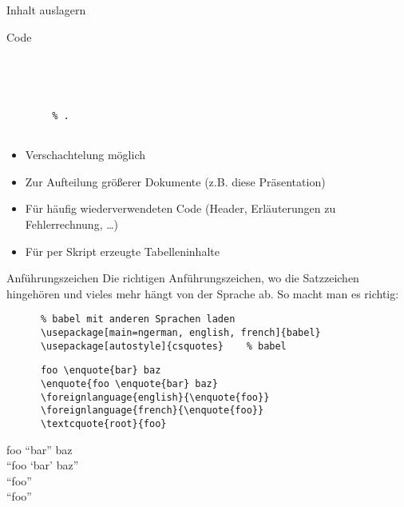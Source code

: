 \begin{frame}[fragile]{Inhalt auslagern}
  \begin{block}{Code}
    \begin{lstlisting}
      
      
        
        
        % .
      
    \end{lstlisting}
  \end{block}
  \begin{itemize}
    \item Verschachtelung möglich
    \item Zur Aufteilung größerer Dokumente (z.B. diese Präsentation)
    \item Für häufig wiederverwendeten Code (Header, Erläuterungen zu Fehlerrechnung, …)
    \item Für per Skript erzeugte Tabelleninhalte
  \end{itemize}
\end{frame}

\begin{frame}[fragile]{
  Anführungszeichen
  \hfill
}
  Die richtigen Anführungszeichen, wo die Satzzeichen hingehören und vieles mehr hängt von der Sprache ab.
  So macht man es richtig:
  \begin{Packages}
    \begin{lstlisting}
      % babel mit anderen Sprachen laden
      \usepackage[main=ngerman, english, french]{babel}
      \usepackage[autostyle]{csquotes}    % babel
    \end{lstlisting}
  \end{Packages}
  \begin{CodeExample}{0.60}
    \begin{lstlisting}
      foo \enquote{bar} baz
      \enquote{foo \enquote{bar} baz}
      \foreignlanguage{english}{\enquote{foo}}
      \foreignlanguage{french}{\enquote{foo}}
      \textcquote{root}{foo}
    \end{lstlisting}
  \CodeResult
    \strut
    foo \enquote{bar} baz \\
    \enquote{foo \enquote{bar} baz} \\
    \foreignlanguage{english}{\enquote{foo}}\\
    \foreignlanguage{french}{\enquote{foo}}\\
  \end{CodeExample}
\end{frame}
